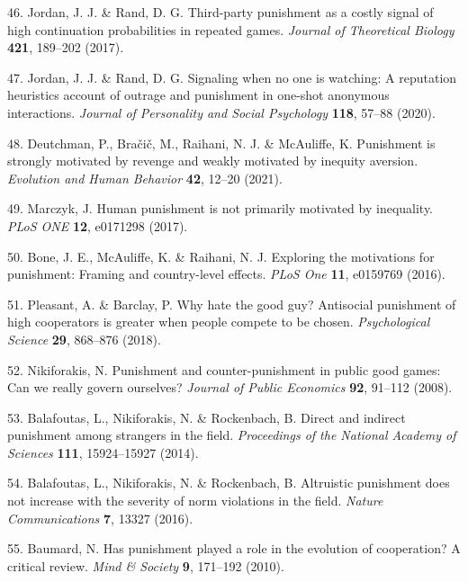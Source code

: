 \documentclass[
  english,
  man, donotrepeattitle,floatsintext]{apa6}
\newenvironment{cslreferences}%
  {}%
  {\par}
\begin{document}
\begin{cslreferences}
\leavevmode\hypertarget{ref-Jordan2017}{}%
46. Jordan, J. J. \& Rand, D. G. Third-party punishment as a costly signal of high continuation probabilities in repeated games. \emph{Journal of Theoretical Biology} \textbf{421}, 189--202 (2017).

\leavevmode\hypertarget{ref-Jordan2020}{}%
47. Jordan, J. J. \& Rand, D. G. Signaling when no one is watching: A reputation heuristics account of outrage and punishment in one-shot anonymous interactions. \emph{Journal of Personality and Social Psychology} \textbf{118}, 57--88 (2020).

\leavevmode\hypertarget{ref-Deutchman2021}{}%
48. Deutchman, P., Bračič, M., Raihani, N. J. \& McAuliffe, K. Punishment is strongly motivated by revenge and weakly motivated by inequity aversion. \emph{Evolution and Human Behavior} \textbf{42}, 12--20 (2021).

\leavevmode\hypertarget{ref-Marczyk2017}{}%
49. Marczyk, J. Human punishment is not primarily motivated by inequality. \emph{PLoS ONE} \textbf{12}, e0171298 (2017).

\leavevmode\hypertarget{ref-Bone2016}{}%
50. Bone, J. E., McAuliffe, K. \& Raihani, N. J. Exploring the motivations for punishment: Framing and country-level effects. \emph{PLoS One} \textbf{11}, e0159769 (2016).

\leavevmode\hypertarget{ref-Pleasant2018}{}%
51. Pleasant, A. \& Barclay, P. Why hate the good guy? Antisocial punishment of high cooperators is greater when people compete to be chosen. \emph{Psychological Science} \textbf{29}, 868--876 (2018).

\leavevmode\hypertarget{ref-Nikiforakis2008b}{}%
52. Nikiforakis, N. Punishment and counter-punishment in public good games: Can we really govern ourselves? \emph{Journal of Public Economics} \textbf{92}, 91--112 (2008).

\leavevmode\hypertarget{ref-Balafoutas2014}{}%
53. Balafoutas, L., Nikiforakis, N. \& Rockenbach, B. Direct and indirect punishment among strangers in the field. \emph{Proceedings of the National Academy of Sciences} \textbf{111}, 15924--15927 (2014).

\leavevmode\hypertarget{ref-Balafoutas2016}{}%
54. Balafoutas, L., Nikiforakis, N. \& Rockenbach, B. Altruistic punishment does not increase with the severity of norm violations in the field. \emph{Nature Communications} \textbf{7}, 13327 (2016).

\leavevmode\hypertarget{ref-Baumard2010}{}%
55. Baumard, N. Has punishment played a role in the evolution of cooperation? A critical review. \emph{Mind \& Society} \textbf{9}, 171--192 (2010).


\end{cslreferences}
\end{document}
